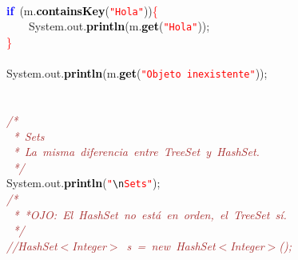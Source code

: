 {{\mbox{}\ \ \ \ \ \ \ \ \ \ \ \ \ \ \ \  \\
\mbox{}\ \ \ \ \ \ \ \ \textbf{\textcolor{Blue}{if}}\ \textcolor{BrickRed}{(}m\textcolor{BrickRed}{.}\textbf{\textcolor{Black}{containsKey}}\textcolor{BrickRed}{(}\texttt{\textcolor{Red}{"{}Hola"{}}}\textcolor{BrickRed}{))}\textcolor{Red}{\{} \\
\mbox{}\ \ \ \ \ \ \ \ \ \ \ \ System\textcolor{BrickRed}{.}out\textcolor{BrickRed}{.}\textbf{\textcolor{Black}{println}}\textcolor{BrickRed}{(}m\textcolor{BrickRed}{.}\textbf{\textcolor{Black}{get}}\textcolor{BrickRed}{(}\texttt{\textcolor{Red}{"{}Hola"{}}}\textcolor{BrickRed}{));} \\
\mbox{}\ \ \ \ \ \ \ \ \textcolor{Red}{\}} \\
\mbox{}\ \ \ \ \ \ \ \ \ \ \ \ \ \ \ \  \\
\mbox{}\ \ \ \ \ \ \ \ System\textcolor{BrickRed}{.}out\textcolor{BrickRed}{.}\textbf{\textcolor{Black}{println}}\textcolor{BrickRed}{(}m\textcolor{BrickRed}{.}\textbf{\textcolor{Black}{get}}\textcolor{BrickRed}{(}\texttt{\textcolor{Red}{"{}Objeto\ inexistente"{}}}\textcolor{BrickRed}{));} \\
\mbox{}\ \ \ \ \ \ \ \ \ \ \ \ \ \ \ \  \\
\mbox{}\ \ \ \ \ \ \ \ \ \ \ \ \ \ \ \  \\
\mbox{}\ \ \ \ \ \ \ \ \textit{\textcolor{Brown}{/*}} \\
\mbox{}\textit{\textcolor{Brown}{\ \ \ \ \ \ \ \ \ *\ Sets}} \\
\mbox{}\textit{\textcolor{Brown}{\ \ \ \ \ \ \ \ \ *\ La\ misma\ diferencia\ entre\ TreeSet\ y\ HashSet.}} \\
\mbox{}\textit{\textcolor{Brown}{\ \ \ \ \ \ \ \ \ */}} \\
\mbox{}\ \ \ \ \ \ \ \ System\textcolor{BrickRed}{.}out\textcolor{BrickRed}{.}\textbf{\textcolor{Black}{println}}\textcolor{BrickRed}{(}\texttt{\textcolor{Red}{"{}}}\texttt{\textcolor{CarnationPink}{\textbackslash{}n}}\texttt{\textcolor{Red}{Sets"{}}}\textcolor{BrickRed}{);} \\
\mbox{}\ \ \ \ \ \ \ \ \textit{\textcolor{Brown}{/*}} \\
\mbox{}\textit{\textcolor{Brown}{\ \ \ \ \ \ \ \ \ *\ *OJO:\ El\ HashSet\ no\ está\ en\ orden,\ el\ TreeSet\ sí.}} \\
\mbox{}\textit{\textcolor{Brown}{\ \ \ \ \ \ \ \ \ */}} \\
\mbox{}\ \ \ \ \ \ \ \ \textit{\textcolor{Brown}{//HashSet$<$Integer$>$\ s\ =\ new\ HashSet$<$Integer$>$();}} \\
}}
